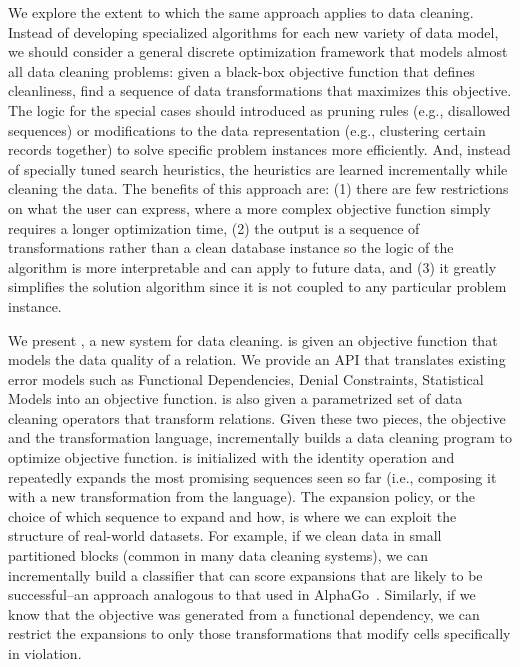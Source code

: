 We explore the extent to which the same approach applies to data cleaning.
Instead of developing specialized algorithms for each new variety of data model, we should consider a general discrete optimization framework that models almost all data cleaning problems: given a black-box objective function that defines cleanliness, find a sequence of data transformations that maximizes this objective.
The logic for the special cases should introduced as pruning rules (e.g., disallowed sequences) or modifications to the data representation (e.g., clustering certain records together) to solve specific problem instances more efficiently.
And, instead of specially tuned search heuristics, the heuristics are learned incrementally while cleaning the data.
The benefits of this approach are: (1) there are few restrictions on what the user can express, where a more complex objective function simply requires a longer optimization time, (2) the output is a sequence of transformations rather than a clean database instance so the logic of the algorithm is more interpretable and can apply to future data, and (3) it greatly simplifies the solution algorithm since it is not coupled to any particular problem instance.

We present \sys, a new system for data cleaning.
\sys is given an objective function that models the data quality of a relation.
We provide an API that translates existing error models such as Functional Dependencies, Denial Constraints, Statistical Models into an objective function.
\sys is also given a parametrized set of data cleaning operators that transform relations.
Given these two pieces, the objective and the transformation language, \sys incrementally builds a data cleaning program to optimize objective function.
\sys is initialized with the identity operation and repeatedly expands the most promising sequences seen so far (i.e., composing it with a new transformation from the language).
The expansion policy, or the choice of which sequence to expand and how, is where we can exploit the structure of real-world datasets.
For example, if we clean data in small partitioned blocks (common in many data cleaning systems), we can incrementally build a classifier that can score expansions that are likely to be successful--an approach analogous to that used in AlphaGo~\cite{silver2016mastering}.
Similarly, if we know that the objective was generated from a functional dependency, we can restrict the expansions to only those transformations that modify cells specifically in violation. 

